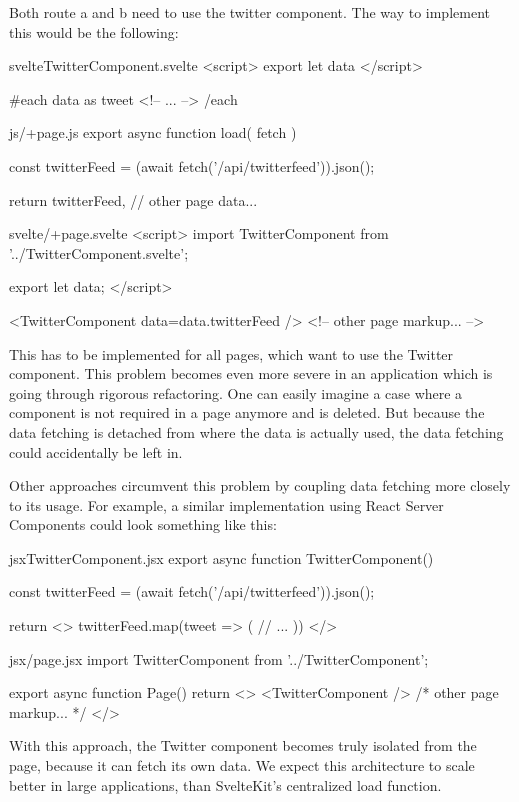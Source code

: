 Both route a and b need to use the twitter component. The way to implement this would be the following:

\begin{myminted}{svelte}{TwitterComponent.svelte}
<script>
    export let data
</script>

{#each data as tweet}
    <!-- ... -->
{/each}
\end{myminted}

\begin{myminted}{js}{/+page.js}
export async function load({ fetch }) {

    const twitterFeed = (await fetch('/api/twitterfeed')).json();

    return {
        twitterFeed,
        // other page data...
    }
}
\end{myminted}

\begin{myminted}{svelte}{/+page.svelte}
<script>
    import TwitterComponent from '../TwitterComponent.svelte';

    export let data;
</script>

<TwitterComponent data={data.twitterFeed} />
<!-- other page markup... -->
\end{myminted}

This has to be implemented for all pages, which want to use the Twitter component. This problem becomes even more severe in an application which is going through rigorous refactoring. One can easily imagine a case where a component is not required in a page anymore and is deleted. But because the data fetching is detached from where the data is actually used, the data fetching could accidentally be left in.

Other approaches circumvent this problem by coupling data fetching more closely to its usage. For example, a similar implementation using React Server Components could look something like this: 

\begin{myminted}{jsx}{TwitterComponent.jsx}
export async function TwitterComponent() {
    const twitterFeed = (await fetch('/api/twitterfeed')).json();

    return <>
        {twitterFeed.map(tweet => ( 
            // ...
        ))}
    </>
}    
\end{myminted}

\begin{myminted}{jsx}{/page.jsx}
import TwitterComponent from '../TwitterComponent';

export async function Page() {
    return <>
        <TwitterComponent />
        { /* other page markup... */ }
    </>
}
\end{myminted}

With this approach, the Twitter component becomes truly isolated from the page, because it can fetch its own data. We expect this architecture to scale better in large applications, than SvelteKit's centralized load function.




